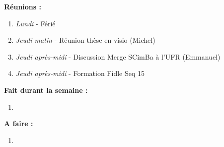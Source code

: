 \textbf{Réunions :}
\begin{enumerate}[label=\textbullet]
	\item \textit{Lundi} - Férié
	\item \textit{Jeudi matin} - Réunion thèse en visio (Michel)
	\item \textit{Jeudi après-midi} - Discussion Merge SCimBa à l'UFR (Emmanuel)
	\item \textit{Jeudi après-midi} - Formation Fidle Seq 15
\end{enumerate}
\textbf{Fait durant la semaine :}
\begin{enumerate}[label=\textbullet]
	\item 
\end{enumerate}
\textbf{A faire :}
\begin{enumerate}[label=\textbullet]
	\item 
\end{enumerate}